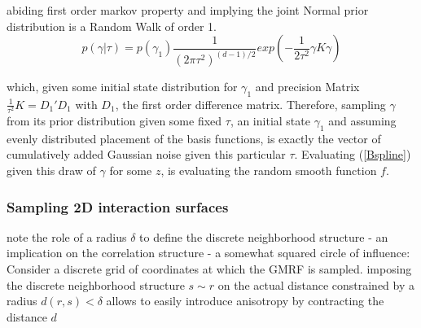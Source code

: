 \documentclass[11pt]{article}
\begin{document}
            abiding first order markov property and implying the joint Normal prior distribution is a Random Walk of order 1.
            \begin{equation} \label{1dprior}
                p(\gamma|\tau) = p(\gamma_1)\frac{1}{(2\pi\tau^2)^{(d-1)/2}}exp\left( -\frac{1}{2\tau^2} \gamma K \gamma \right)
            \end{equation}

            which, given some initial state distribution for $\gamma_1$ and precision Matrix $\frac{1}{\tau^2}K = D_1'D_1$ with $D_1$, the first order difference matrix.  Therefore, sampling $\gamma$ from its prior distribution given some fixed $\tau$, an initial state $\gamma_1$ and assuming evenly distributed placement of the basis functions, is exactly the vector of cumulatively added Gaussian noise given this particular $\tau$. Evaluating (\ref{Bspline}) given this draw of $\gamma$ for some $z$, is evaluating the random smooth function $f$.



            \subsubsection{Sampling 2D interaction surfaces}

            note the role of a radius $\delta$ to define the discrete neighborhood structure - an implication on the correlation structure - a somewhat squared circle of influence: Consider a discrete grid of coordinates at which the GMRF is sampled. imposing the discrete neighborhood structure $s \sim r$ on the actual distance constrained by a radius $d(r,s)<\delta$ allows to easily introduce anisotropy by contracting the distance $d$
\end{document}
